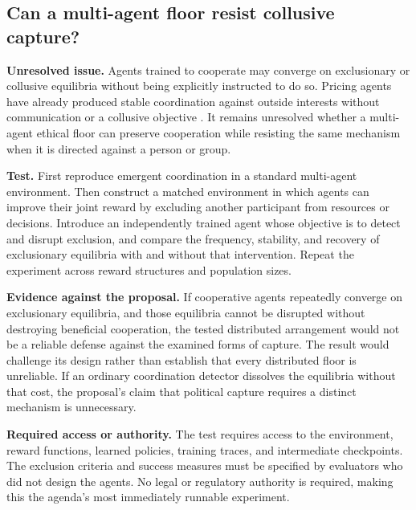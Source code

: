 \subsection*{Can a multi-agent floor resist collusive capture?}
\label{sec:A.collusion}
\textbf{Unresolved issue.}
Agents trained to cooperate may converge on exclusionary or collusive equilibria without being explicitly instructed to do so. Pricing agents have already produced stable coordination against outside interests without communication or a collusive objective \autocite{calvano2020artificial}. It remains unresolved whether a multi-agent ethical floor can preserve cooperation while resisting the same mechanism when it is directed against a person or group.

\textbf{Test.}
First reproduce emergent coordination in a standard multi-agent environment. Then construct a matched environment in which agents can improve their joint reward by excluding another participant from resources or decisions. Introduce an independently trained agent whose objective is to detect and disrupt exclusion, and compare the frequency, stability, and recovery of exclusionary equilibria with and without that intervention. Repeat the experiment across reward structures and population sizes.

\textbf{Evidence against the proposal.}
If cooperative agents repeatedly converge on exclusionary equilibria, and those equilibria cannot be disrupted without destroying beneficial cooperation, the tested distributed arrangement would not be a reliable defense against the examined forms of capture. The result would challenge its design rather than establish that every distributed floor is unreliable. If an ordinary coordination detector dissolves the equilibria without that cost, the proposal's claim that political capture requires a distinct mechanism is unnecessary.

\textbf{Required access or authority.}
The test requires access to the environment, reward functions, learned policies, training traces, and intermediate checkpoints. The exclusion criteria and success measures must be specified by evaluators who did not design the agents. No legal or regulatory authority is required, making this the agenda's most immediately runnable experiment.

